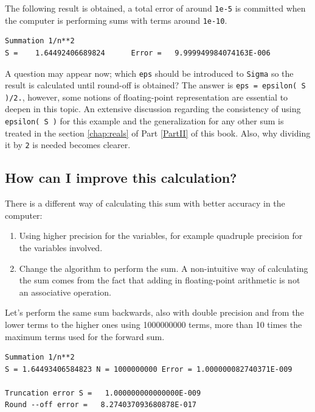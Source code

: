 The following result is obtained, a total error of around \texttt{1e-5} is committed
when the computer is performing sums with terms around \texttt{1e-10}.  

\begin{verbatim} 
Summation 1/n**2
S =    1.64492406689824      Error =   9.999949984074163E-006
\end{verbatim}

A question may appear now; which \texttt{eps} should be introduced to \texttt{Sigma} so the result is calculated until round-off is obtained?
The answer is \texttt{eps = epsilon( S )/2.}, however, some notions of floating-point representation are essential to deepen in this topic.
An extensive discussion regarding the consistency of using \texttt{epsilon( S )} for this example and the generalization for any other sum 
is treated in the section \ref{chap:reals} of Part \ref{PartII} of this book. Also, why dividing it by \texttt{2} is needed becomes clearer. 




 
    \subsection{How can I improve this calculation?}
    
There is a different way of calculating this sum with better accuracy in the computer:
\begin{enumerate}
    \item Using higher precision for the variables, for example quadruple precision for the variables involved. 
    \item Change the algorithm to perform the sum. A non-intuitive way of calculating the sum comes from the fact
    that adding in floating-point arithmetic is not an associative operation. 
\end{enumerate}

Let's perform the same sum backwards, also with double precision and from the lower terms to the higher ones using 1000000000 terms, more than 10 times the maximum terms
used for the forward sum. 

\begin{verbatim} 
Summation 1/n**2
S = 1.64493406584823 N = 1000000000 Error = 1.000000082740371E-009

Truncation error S =   1.000000000000000E-009
Round --off error =   8.274037093680878E-017
\end{verbatim}
 
